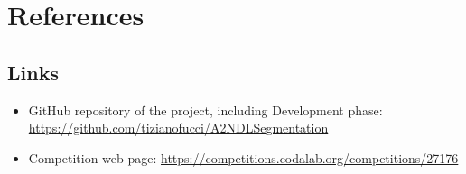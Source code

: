 \documentclass[12pt,a4paper]{report}
\begin{document}
	\chapter{References}
		\section{Links}

\begin{itemize}
	\item GitHub repository of the project, including Development phase: \url{https://github.com/tizianofucci/A2NDLSegmentation}
	\item Competition web page: \url{https://competitions.codalab.org/competitions/27176}
\end{itemize}
\end{document}
